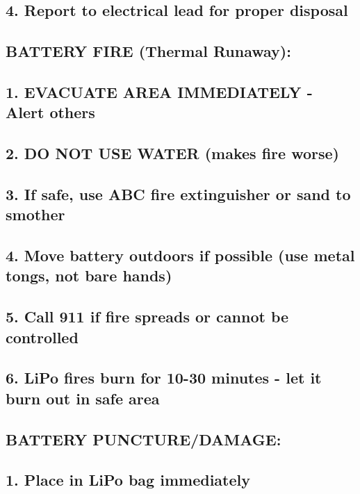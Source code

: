 \documentclass[11pt,letterpaper]{article}
\begin{document}
\subsection*{4. Report to electrical lead for proper disposal}

\subsection*{BATTERY FIRE (Thermal Runaway):}

\subsection*{1. EVACUATE AREA IMMEDIATELY - Alert others}

\subsection*{2. DO NOT USE WATER (makes fire worse)}

\subsection*{3. If safe, use ABC fire extinguisher or sand to smother}

\subsection*{4. Move battery outdoors if possible (use metal tongs, not bare hands)}

\subsection*{5. Call 911 if fire spreads or cannot be controlled}

\subsection*{6. LiPo fires burn for 10-30 minutes - let it burn out in safe area}

\subsection*{BATTERY PUNCTURE/DAMAGE:}

\subsection*{1. Place in LiPo bag immediately}
\end{document}
